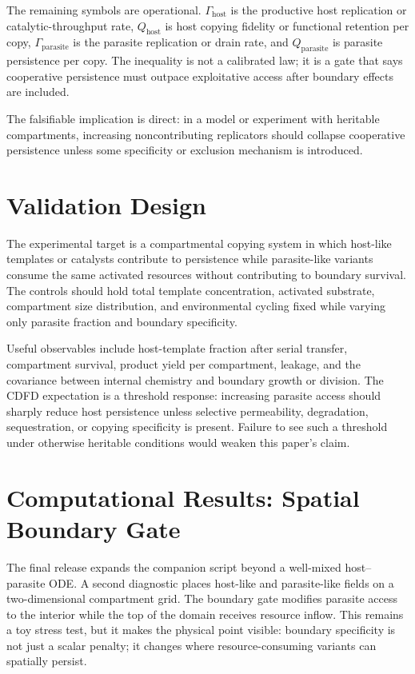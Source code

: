 \documentclass[11pt,a4paper]{article}
\begin{document}
The remaining symbols are operational. $\Gamma_{\mathrm{host}}$ is the productive host replication or catalytic-throughput rate, $Q_{\mathrm{host}}$ is host copying fidelity or functional retention per copy, $\Gamma_{\mathrm{parasite}}$ is the parasite replication or drain rate, and $Q_{\mathrm{parasite}}$ is parasite persistence per copy. The inequality is not a calibrated law; it is a gate that says cooperative persistence must outpace exploitative access after boundary effects are included.

The falsifiable implication is direct: in a model or experiment with heritable compartments, increasing noncontributing replicators should collapse cooperative persistence unless some specificity or exclusion mechanism is introduced.

\section{Validation Design}
The experimental target is a compartmental copying system in which host-like templates or catalysts contribute to persistence while parasite-like variants consume the same activated resources without contributing to boundary survival. The controls should hold total template concentration, activated substrate, compartment size distribution, and environmental cycling fixed while varying only parasite fraction and boundary specificity.

Useful observables include host-template fraction after serial transfer, compartment survival, product yield per compartment, leakage, and the covariance between internal chemistry and boundary growth or division. The CDFD expectation is a threshold response: increasing parasite access should sharply reduce host persistence unless selective permeability, degradation, sequestration, or copying specificity is present. Failure to see such a threshold under otherwise heritable conditions would weaken this paper's claim.

\section{Computational Results: Spatial Boundary Gate}
The final release expands the companion script beyond a well-mixed
host--parasite ODE. A second diagnostic places host-like and parasite-like
fields on a two-dimensional compartment grid. The boundary gate modifies
parasite access to the interior while the top of the domain receives resource
inflow. This remains a toy stress test, but it makes the physical point
visible: boundary specificity is not just a scalar penalty; it changes where
resource-consuming variants can spatially persist.
\end{document}

